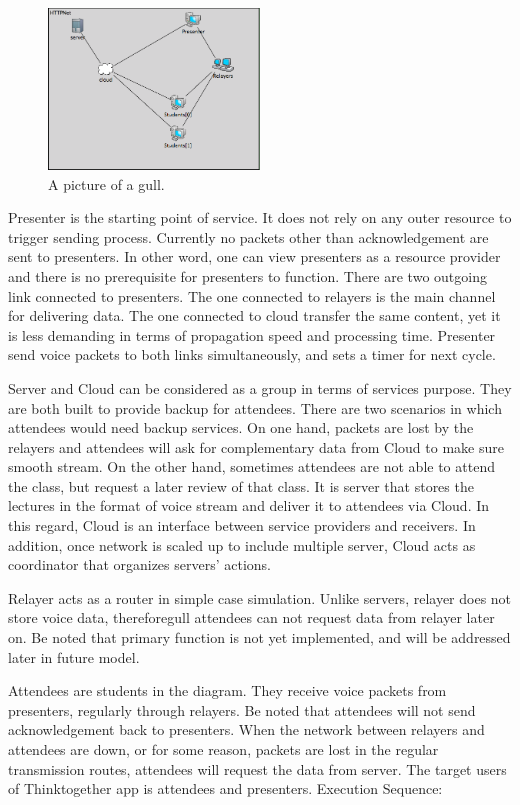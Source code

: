 \begin{figure}[h!]  
  \centering
    \includegraphics[width=0.5\textwidth]{figures/sce.png}
  \caption{A picture of a gull.}
\end{figure}

Presenter is the starting point of service. It does not rely on any outer 
resource to trigger sending process. Currently no packets other than 
acknowledgement are sent to presenters. In other word, one can view presenters 
as a resource provider and there is no prerequisite for presenters to function. 
There are two outgoing link connected to presenters. The one connected to 
relayers is the main channel for delivering data. The one connected to cloud 
transfer the same content, yet it is less demanding in terms of propagation 
speed and processing time. Presenter send voice packets to both links 
simultaneously, and sets a timer for next cycle. 

Server and Cloud can be considered as a group in terms of services purpose. They 
are both built to provide backup for attendees. There are two scenarios in which 
attendees would need backup services. On one hand, packets are lost by the 
relayers and attendees will ask for complementary data from Cloud to make sure 
smooth stream. On the other hand, sometimes attendees are not able to attend the 
class, but request a later review of that class. It is server that stores the 
lectures in the format of voice stream and deliver it to attendees via Cloud. In 
this regard, Cloud is an interface between service providers and receivers. In 
addition, once network is scaled up to include multiple server, Cloud acts as 
coordinator that organizes servers’ actions. 

Relayer acts as a router in simple case simulation. Unlike servers, relayer does 
not store voice data, thereforegull attendees can not request data from relayer 
later on. Be noted that primary function is not yet implemented, and will be 
addressed later in future model. 

Attendees are students in the diagram. They receive voice packets from 
presenters, regularly through relayers. Be noted that attendees will not send 
acknowledgement back to presenters. When the network between relayers and 
attendees are down, or for some reason, packets are lost in the regular 
transmission routes, attendees will request the data from server. The target 
users of Thinktogether app is attendees and presenters.  
Execution Sequence:

